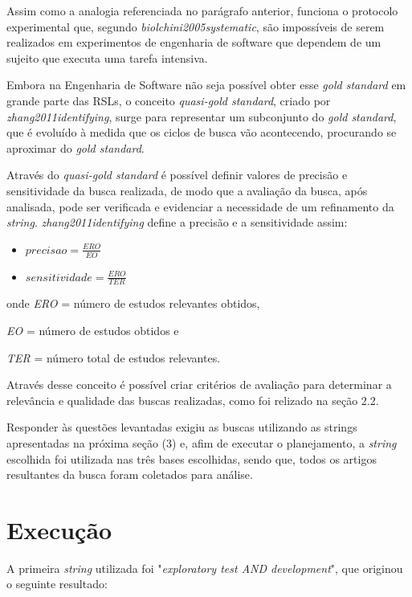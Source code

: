 Assim como a analogia referenciada no parágrafo anterior, funciona o protocolo experimental que, segundo \textit{biolchini2005systematic}, são impossíveis de serem realizados em experimentos de engenharia de software que dependem de um sujeito que executa uma tarefa intensiva. 

Embora na Engenharia de Software não seja possível obter esse \textit{gold standard} em grande parte das RSLs, o conceito \textit{quasi-gold standard}, criado por \textit{zhang2011identifying}, surge para representar um subconjunto do \textit{gold standard}, que é evoluído à medida que os ciclos de busca vão acontecendo, procurando se aproximar do \textit{gold standard}.

Através do \textit{quasi-gold standard} é possível definir valores de precisão e sensitividade da busca realizada, de modo que a avaliação da busca, após analisada, pode ser verificada e evidenciar a necessidade de um refinamento da \textit{string}. \textit{zhang2011identifying} define a precisão e a sensitividade assim:

\begin{itemize}

    \item $precisao = \frac{ERO}{EO}$ 
	\item $sensitividade = \frac{ERO}{TER}$

\end{itemize}

onde \textit{ERO} = número de estudos relevantes obtidos,
		
	  \textit{EO} = número de estudos obtidos e

	   \textit{TER} = número total de estudos relevantes.

Através desse conceito é possível criar critérios de avaliação para determinar a relevância e qualidade das buscas realizadas, como foi relizado na seção 2.2.

Responder às questões levantadas exigiu as buscas utilizando as strings apresentadas na próxima seção (3) e, afim de executar o planejamento, a \textit{string} escolhida foi utilizada nas três bases escolhidas, sendo que, todos os artigos resultantes da busca foram coletados para análise. 

\section{Execução}
A primeira \textit{string} utilizada foi "\textit{exploratory test AND development}", que originou o seguinte resultado:


